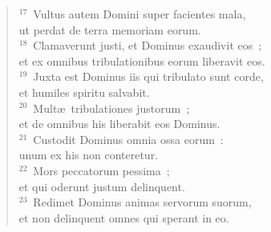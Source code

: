 \begin{verse}
${}^{17}$~Vultus autem Domini super facientes mala,\\ ut perdat de terra memoriam eorum.\\
${}^{18}$~Clamaverunt justi, et Dominus exaudivit eos~;\\ et ex omnibus tribulationibus eorum liberavit eos.\\
${}^{19}$~Juxta est Dominus iis qui tribulato sunt corde,\\ et humiles spiritu salvabit.\\
${}^{20}$~Mult\ae\ tribulationes justorum~;\\ et de omnibus his liberabit eos Dominus.\\
${}^{21}$~Custodit Dominus omnia ossa eorum~:\\ unum ex his non conteretur.\\
${}^{22}$~Mors peccatorum pessima~;\\ et qui oderunt justum delinquent.\\
${}^{23}$~Redimet Dominus animas servorum suorum,\\ et non delinquent omnes qui sperant in eo.\end{verse}



